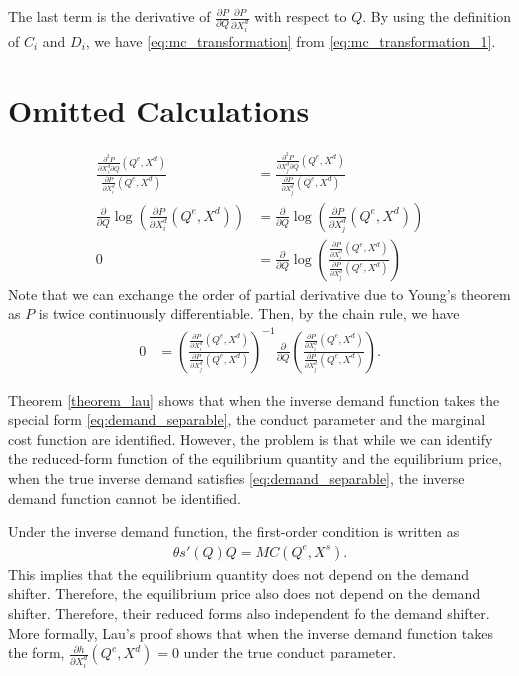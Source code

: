 \documentclass[11pt, a4paper]{article}
\theoremstyle{remark}
\begin{document}
The last term is the derivative of $ \frac{\partial P}{\partial Q} \frac{\partial P}{\partial X^{d}_i}$ with respect to $Q$.
By using the definition of $C_i$ and $D_i$,  we have \eqref{eq:mc_transformation} from \eqref{eq:mc_transformation_1}.


\section{Omitted Calculations}\label{omitted_calculation}


\begin{align}
    \frac{\frac{\partial^2 P}{\partial X^{d}_{i} \partial Q}(Q^e, X^{d})}{\frac{\partial P}{\partial X^{d}_{i}}(Q^e, X^{d})}  & = \frac{\frac{\partial^2 P}{\partial X^{d}_{j} \partial Q}(Q^e, X^{d})}{\frac{\partial P}{\partial X^{d}_{j}}(Q^e, X^{d})}\\ 
    \frac{\partial }{\partial Q} \log\left( \frac{\partial P}{\partial X^{d}_{i}}(Q^e, X^{d})\right) &= \frac{\partial }{\partial Q} \log\left( \frac{\partial P}{\partial X^{d}_{j}}(Q^e, X^{d})\right)\\
    0& = \frac{\partial}{\partial Q}\log\left(\frac{\frac{\partial P}{\partial X^{d}_{i}}(Q^e, X^{d})}{\frac{\partial P}{\partial X^{d}_{j}}(Q^e, X^{d})}\right)
\end{align}
Note that we can exchange the order of partial derivative due to Young's theorem as $P$ is twice continuously differentiable.
Then, by the chain rule, we have
\begin{align}
    0 & = \left(\frac{\frac{\partial P}{\partial X^{d}_{i}}(Q^e, X^{d})}{\frac{\partial P}{\partial X^{d}_{j}}(Q^e, X^{d})}\right)^{-1} \frac{\partial}{\partial Q} \left(\frac{\frac{\partial P}{\partial X^{d}_{i}}(Q^e, X^{d})}{\frac{\partial P}{\partial X^{d}_{j}}(Q^e, X^{d})}\right).
\end{align}




Theorem \ref{theorem_lau} shows that when the inverse demand function takes the special form \eqref{eq:demand_separable}, the conduct parameter and the marginal cost function are identified.
However, the problem is that while we can identify the reduced-form function of the equilibrium quantity and the equilibrium price, when the true inverse demand satisfies \eqref{eq:demand_separable}, the inverse demand function cannot be identified.

Under the inverse demand function, the first-order condition is written as
\begin{align}
    \theta s'(Q)Q = MC(Q^e, X^{s}).
\end{align}
This implies that the equilibrium quantity does not depend on the demand shifter.
Therefore, the equilibrium price also does not depend on the demand shifter.
Therefore, their reduced forms also independent fo the demand shifter.
More formally, Lau's proof shows that when the inverse demand function takes the form, $\frac{\partial h}{\partial X_i^{d}}(Q^e, X^{d}) = 0$ under the true conduct parameter. 
\end{document}
